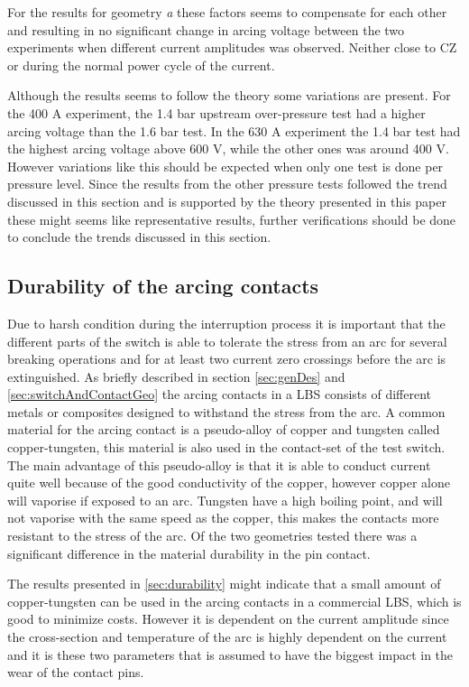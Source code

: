 \documentclass[10pt,a4paper,twoside]{article}
\begin{document}
For the results for geometry \textit{a} these factors seems to compensate for each other and resulting in no significant change in arcing voltage between the two experiments when different current amplitudes was observed. Neither close to CZ or during the normal power cycle of the current. 

Although the results seems to follow the theory some variations are present. For the 400 A experiment, the 1.4 bar upstream over-pressure test had a higher arcing voltage than the 1.6 bar test. In the 630 A experiment the 1.4 bar test had the highest arcing voltage above 600 V, while the other ones was around 400 V. However variations like this should be expected when only one test is done per pressure level. Since the results from the other pressure tests followed the trend discussed in this section and is supported by the theory presented in this paper these might seems like representative results, further verifications should be done to conclude the trends discussed in this section.

\subsection{Durability of the arcing contacts} \label{fig:durability}

Due to harsh condition during the interruption process it is important that the different parts of the switch is able to tolerate the stress from an arc for several breaking operations and for at least two current zero crossings before the arc is extinguished. As briefly described in section \ref{sec:genDes} and \ref{sec:switchAndContactGeo} the arcing contacts in a LBS consists of different metals or composites designed to withstand the stress from the arc. A common material for the arcing contact is a pseudo-alloy of copper and tungsten called copper-tungsten, this material is also used in the contact-set of the test switch. The main advantage of this pseudo-alloy is that it is able to conduct current quite well because of the good conductivity of the copper, however copper alone will vaporise if exposed to an arc. Tungsten have a high boiling point, and will not vaporise with the same speed as the copper, this makes the contacts more resistant to the stress of the arc. Of the two geometries tested there was a significant difference in the material durability in the pin contact.

The results presented in \ref{sec:durability} might indicate that a small amount of copper-tungsten can be used in the arcing contacts in a commercial LBS, which is good to minimize costs. However it is dependent on the current amplitude since the cross-section and temperature of the arc is highly dependent on the current and it is these two parameters that is assumed to have the biggest impact in the wear of the contact pins. 
\end{document}
